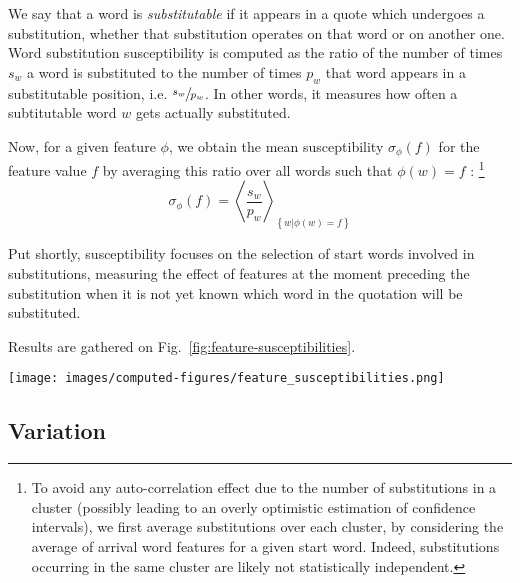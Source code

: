 We say that a word is \emph{substitutable} if it appears in a quote which undergoes a substitution, whether that substitution operates on that word or on another one.
Word substitution susceptibility is computed as the ratio of the number of times $s_w$ a word is substituted to the number of times $p_w$ that word appears in a substitutable position, \hbox{i.e.} $\sfrac{s_w}{p_w}$. In other words, it measures how often a subtitutable word $w$ gets actually substituted.

Now, for a given feature $\phi$, we obtain the mean susceptibility $\sigma_{\phi}(f)$ for the feature value $f$ by averaging this ratio over all words such that $\phi(w) = f$%
:
\footnote{To avoid any auto-correlation effect due to the number of substitutions in a cluster (possibly leading to an overly optimistic estimation of confidence intervals), we first average substitutions over each cluster, by considering the average of arrival word features for a given start word.
Indeed, substitutions occurring in the same cluster are likely not statistically independent.}
$$\sigma_{\phi}(f) = \left< \frac{s_w}{p_w} \right>_{\left\lbrace w | \phi(w) = f \right\rbrace}$$

Put shortly, susceptibility focuses on the selection of start words involved in substitutions, measuring the effect of features at the moment preceding the substitution when it is not yet known which word in the quotation will be substituted.

\medskip
Results are gathered on Fig.~\ref{fig:feature-susceptibilities}.


\begin{figure*}[!th]
    \centering
    \texttt{[image: images/computed-figures/feature\_susceptibilities.png]}
    \caption{\textbf{Substitution susceptibility:} average susceptibility to substitution vs. average feature value of a candidate word for substitution, with 95\% asymptotic confidence intervals.
    Each feature exhibits a specific and significant pattern favouring either high- or low-valued words for substitution.}
    \label{fig:feature-susceptibilities}
\end{figure*}

\subsection{Variation}

